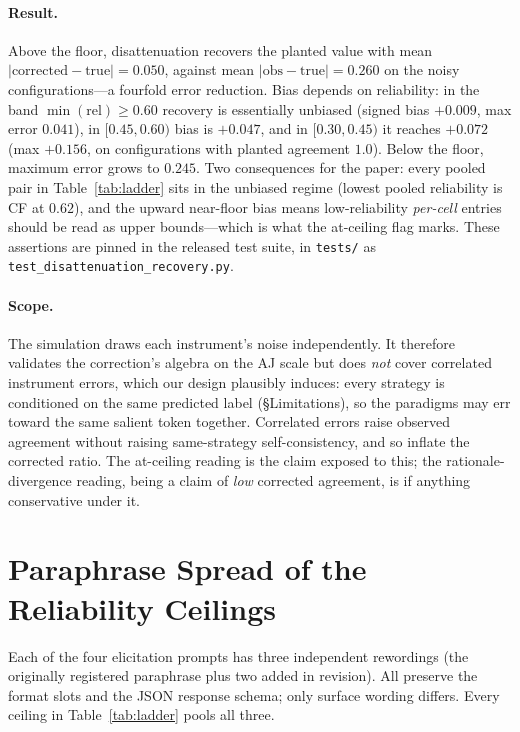 \documentclass[11pt]{article}
\begin{document}
\paragraph{Result.} Above the floor, disattenuation recovers the planted value with mean $|\mathrm{corrected}-\mathrm{true}|=0.050$, against mean $|\mathrm{obs}-\mathrm{true}|=0.260$ on the noisy configurations---a fourfold error reduction. Bias depends on reliability: in the band $\min(\mathrm{rel})\ge0.60$ recovery is essentially unbiased (signed bias $+0.009$, max error $0.041$), in $[0.45,0.60)$ bias is $+0.047$, and in $[0.30,0.45)$ it reaches $+0.072$ (max $+0.156$, on configurations with planted agreement $1.0$). Below the floor, maximum error grows to $0.245$. Two consequences for the paper: every pooled pair in Table~\ref{tab:ladder} sits in the unbiased regime (lowest pooled reliability is CF at $0.62$), and the upward near-floor bias means low-reliability \emph{per-cell} entries should be read as upper bounds---which is what the at-ceiling flag marks. These assertions are pinned in the released test suite, in \texttt{tests/} as \texttt{test\_disattenuation\_\allowbreak recovery.py}.

\paragraph{Scope.} The simulation draws each instrument's noise independently. It therefore validates the correction's algebra on the AJ scale but does \emph{not} cover correlated instrument errors, which our design plausibly induces: every strategy is conditioned on the same predicted label (\S Limitations), so the paradigms may err toward the same salient token together. Correlated errors raise observed agreement without raising same-strategy self-consistency, and so inflate the corrected ratio. The at-ceiling reading is the claim exposed to this; the rationale-divergence reading, being a claim of \emph{low} corrected agreement, is if anything conservative under it.

\section{Paraphrase Spread of the Reliability Ceilings}
\label{app:paraphrase}

Each of the four elicitation prompts has three independent rewordings (the originally registered paraphrase plus two added in revision). All preserve the format slots and the JSON response schema; only surface wording differs. Every ceiling in Table~\ref{tab:ladder} pools all three.
\end{document}
